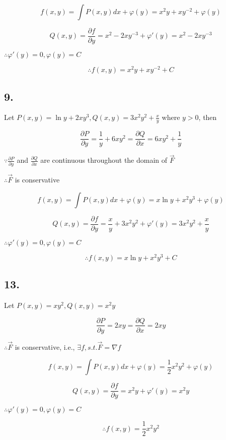 \documentclass{article}
\begin{document}
  $$f(x, y) = \int P(x, y) dx + \varphi(y) = x^2y + xy^{-2} + \varphi(y)$$

  $$Q(x, y) = \frac{\partial f}{\partial y} = x^2 -2xy^{-3} + \varphi'(y) = x^2 - 2xy^{-3}$$

  $\therefore \varphi'(y) = 0, \varphi(y) = C$
  
  $$\therefore f(x, y) = x^2y + xy^{-2} + C$$

  \subsection*{9. }

  Let $P(x, y) = \ln y + 2xy^3, Q(x, y) = 3x^2y^2 + \frac x y$ where $y > 0$, then

  $$\frac{\partial P}{\partial y} = \frac 1 y + 6xy^2 =  \frac{\partial Q}{\partial x} = 6xy^2 + \frac 1 y$$

  $\because \frac{\partial P}{\partial y}$ and $\frac{\partial Q}{\partial x}$ are continuous throughout the domain of $\overrightarrow{F}$

  $\therefore \overrightarrow{F}$ is conservative

  $$f(x, y) = \int P(x, y) dx + \varphi(y) = x\ln y + x^2y^3 + \varphi(y)$$

  $$Q(x, y) = \frac{\partial f}{\partial y} = \frac x y + 3x^2y^2 + \varphi'(y) = 3x^2y^2 + \frac x y$$

  $\therefore \varphi'(y) = 0, \varphi(y) = C$

  $$\therefore f(x, y) = x\ln y + x^2y^3 + C$$

  \subsection*{13. }

  Let $P(x, y) = xy^2, Q(x, y) = x^2y$

  $$\frac{\partial P}{\partial y} = 2xy = \frac{\partial Q}{\partial x} = 2xy$$

  $\therefore \overrightarrow{F}$ is conservative, i.e., $\exists f, s.t. \overrightarrow{F} = \nabla f$

  $$f(x, y) = \int P(x, y) dx + \varphi(y) = \frac 1 2 x^2y^2 + \varphi(y)$$

  $$Q(x, y) = \frac{\partial f}{\partial y} = x^2y + \varphi'(y) = x^2y$$

  $\therefore \varphi'(y) = 0, \varphi(y) = C$

  $$\therefore f(x, y) = \frac 1 2 x^2y^2$$
\end{document}
